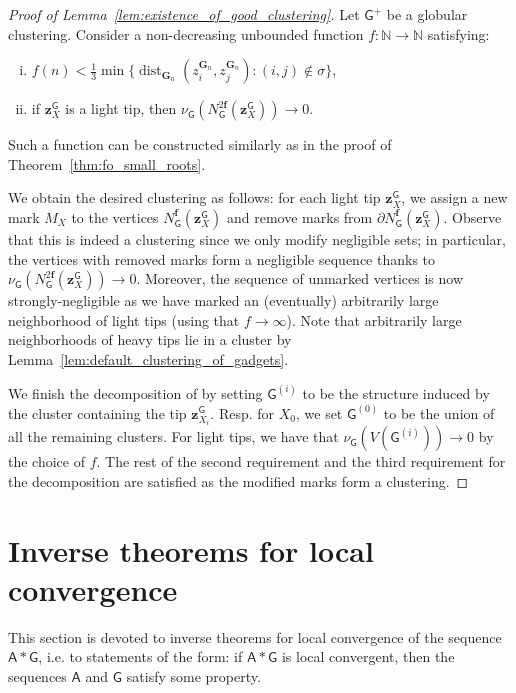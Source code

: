 \documentclass[11pt]{article}
\theoremstyle{plain}
\theoremstyle{definition}
\theoremstyle{remark}
\DeclareMathOperator\dist{dist}
\newcommand{\N}{\mathbb{N}}
\newcommand{\str}[1]{\mathbf{#1}}
\newcommand{\strseq}[1]{{\boldsymbol{\mathsf{#1}}}}
\newcommand{\tpl}[1]{{\bm{#1}}}
\begin{document}
\begin{proof}[Proof of Lemma~\ref{lem:existence_of_good_clustering}]
    Let $\strseq{G}^+$ be a globular clustering.
    Consider a non-decreasing unbounded function $f: \N \to \N$ satisfying:
    \begin{enumerate}[(i)]
        \item $f(n) < \frac{1}{3}\min\{ \dist_{\str{G}_n}(z^{\str{G}_n}_i, z^{\str{G}_n}_j) : (i,j) \not\in \sigma \}$,
        \item if $\tpl{z}^\strseq{G}_X$ is a light tip, then $\nu_\strseq{G}(N^{2\bm{f}}_\strseq{G}(\tpl{z}^\strseq{G}_X)) \to 0$.
\end{enumerate}
    Such a function can be constructed similarly as in the proof of Theorem~\ref{thm:fo_small_roots}.


    We obtain the desired clustering as follows:
    for each light tip $\tpl{z}^\strseq{G}_X$, we assign a new mark $M_X$ to the vertices $N^{\bm{f}}_\strseq{G}(\tpl{z}^\strseq{G}_X)$ and remove marks from $\partial N^{\bm{f}}_\strseq{G}(\tpl{z}^\strseq{G}_X)$.
    Observe that this is indeed a clustering since we only modify negligible sets; in particular, the vertices with removed marks form a negligible sequence thanks to $\nu_\strseq{G}(N^{2\bm{f}}_\strseq{G}(\tpl{z}^\strseq{G}_X)) \to 0$.
    Moreover, the sequence of unmarked vertices is now strongly-negligible as we have marked an (eventually) arbitrarily large neighborhood of light tips (using that $f \to \infty$).
    Note that arbitrarily large neighborhoods of heavy tips lie in a cluster by Lemma~\ref{lem:default_clustering_of_gadgets}.
    
    We finish the decomposition of by setting $\strseq{G}^{(i)}$ to be the structure induced by the cluster containing the tip $\tpl{z}^\strseq{G}_{X_i}$.
    Resp. for $X_0$, we set $\strseq{G}^{(0)}$ to be the union of all the remaining clusters.
    For light tips, we have that $\nu_\strseq{G}(V(\strseq{G}^{(i)})) \to 0$ by the choice of $f$.
    The rest of the second requirement and the third requirement for the decomposition are satisfied as the modified marks form a clustering.
\end{proof}
 \section{Inverse theorems for local convergence}\label{sec:inverse_theorems}

This section is devoted to inverse theorems for local convergence of the sequence $\strseq{A}*\strseq{G}$, i.e. to statements of the form:
if $\strseq{A}*\strseq{G}$ is local convergent, then the sequences $\strseq{A}$ and $\strseq{G}$ satisfy some property.
\end{document}
